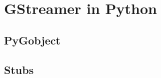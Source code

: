 \section{GStreamer in Python}

\subsection{PyGobject}
\subsection{Stubs}

\cite{pygobjectTypingStubsPyGObject2023}